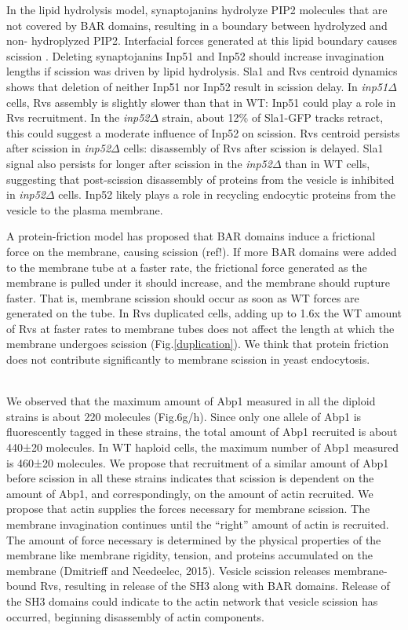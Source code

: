 \documentclass[9pt,lineno]{elife}
\begin{document}
In the lipid hydrolysis model, synaptojanins hydrolyze PIP2 molecules that are not covered by BAR domains, resulting in a boundary between hydrolyzed and non- hydroplyzed PIP2. Interfacial forces generated at this lipid boundary causes scission \cite{Liu2006}. Deleting  synaptojanins Inp51 and Inp52 should increase invagination lengths if scission was driven by lipid hydrolysis. Sla1 and Rvs centroid dynamics shows that deletion of neither Inp51 nor Inp52 result in scission delay. In \textit{inp51$\Delta$}  cells, Rvs assembly is slightly slower than that in WT: Inp51 could play a role in Rvs recruitment. In the \textit{inp52$\Delta$}  strain, about 12\% of Sla1-GFP tracks retract, this could suggest a moderate influence of Inp52 on scission. Rvs centroid persists after scission in \textit{inp52$\Delta$}  cells: disassembly of Rvs after scission is delayed. Sla1 signal also persists for longer after scission in the \textit{inp52$\Delta$} than in WT cells, suggesting that post-scission disassembly of proteins from the vesicle is inhibited in \textit{inp52$\Delta$}  cells. Inp52 likely plays a role in recycling endocytic proteins from the vesicle to the plasma membrane. 

A protein-friction model has proposed that BAR domains induce a frictional force on the membrane, causing scission (ref!). If more BAR domains were added to the membrane tube at a faster rate, the frictional  force generated as the membrane is pulled under it should increase, and the membrane should rupture faster. That is, membrane scission should occur as soon as WT forces are generated on the tube. In Rvs duplicated cells, adding up to 1.6x the WT amount of Rvs at faster rates to membrane tubes does not affect the length at which the membrane undergoes scission (Fig.\ref{duplication}). We think that protein friction does not contribute significantly to membrane scission in yeast endocytosis. 

~\\
We  observed that the maximum amount of Abp1 measured in all the diploid strains is about 220 molecules (Fig.6g/h). Since only one allele of Abp1 is fluorescently tagged in these strains, the total amount of Abp1 recruited is  about 440±20 molecules. In WT haploid cells, the maximum number of Abp1 measured is 460±20 molecules. We propose that recruitment of a similar amount of Abp1 before scission in all these strains indicates that scission is dependent on the amount of Abp1, and correspondingly, on the amount of actin recruited. We propose that actin supplies the forces necessary for membrane scission. The membrane invagination continues until the “right” amount of actin is recruited. The amount of force necessary is determined by the physical properties of the membrane like membrane rigidity, tension, and proteins accumulated on the membrane (Dmitrieff and Needeelec, 2015). Vesicle scission releases membrane-bound Rvs, resulting in release of the SH3 along with BAR domains. Release of the SH3 domains could indicate to the actin network that vesicle scission has occurred, beginning disassembly of actin components. 
\end{document}
